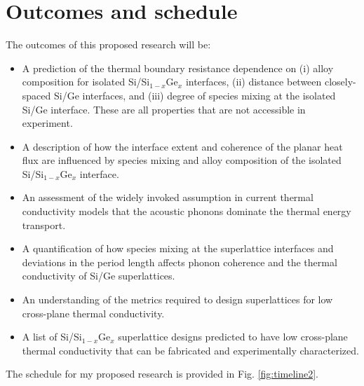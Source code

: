 \documentclass[letterpaper,12pt]{article}
\begin{document}
\clearpage

\section{\label{S-summaryschedule}Outcomes and schedule}

The outcomes of this proposed research will be:

\begin{itemize}

\item A prediction of the thermal boundary resistance
dependence on (i) alloy composition for isolated Si/Si$_{1-x}$Ge$_x$
interfaces, (ii) distance between closely-spaced Si/Ge interfaces,
and (iii) degree of species mixing at the isolated Si/Ge interface.
These are all properties that are not accessible in experiment.

\item A description of how the interface extent and coherence of the
planar heat flux are influenced by species mixing and alloy
composition of the isolated Si/Si$_{1-x}$Ge$_x$ interface.

\item An assessment of the widely invoked assumption in current
thermal conductivity models that the acoustic phonons dominate the
thermal energy transport.

\item A quantification of how species mixing at the
superlattice interfaces and deviations in the period length affects
phonon coherence and the thermal conductivity of Si/Ge
superlattices.

\item An understanding of the metrics required to design superlattices for low
cross-plane thermal conductivity.

\item A list of Si/Si$_{1-x}$Ge$_x$ superlattice designs predicted to have low cross-plane thermal
conductivity that can be fabricated and experimentally
characterized.

\end{itemize}

The schedule for my proposed research is provided in Fig.
\ref{fig:timeline2}.

\vspace{1cm}

\end{document}
